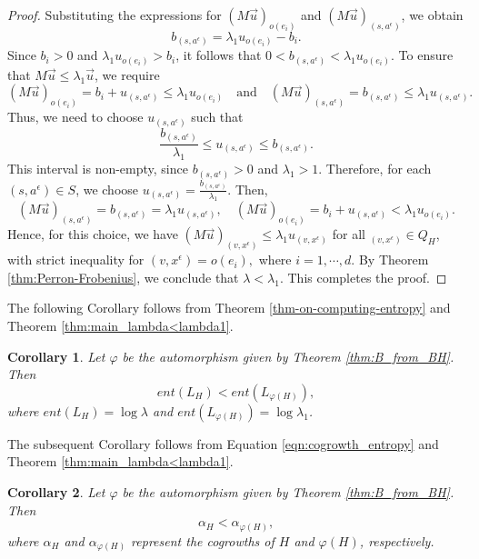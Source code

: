 \documentclass{article}
\newtheorem{mycor}{Corollary}[section]
\newcommand{\e}{\epsilon}
\begin{document}
\begin{proof}
    Substituting the expressions for $(M \overrightarrow{u})_{o(e_i)}$ and $(M \overrightarrow{u})_{(s,a^{\e})}$, we obtain
    $$b_{(s,a^{\e})} = \lambda_1 u_{o(e_i)} - b_i.$$
    Since $b_i > 0$ and $\lambda_1 u_{o(e_i)} > b_i$, it follows that $0 < b_{(s,a^{\e})} < \lambda_1 u_{o(e_i)}.$
    To ensure that $M \overrightarrow{u} \leq \lambda_1 \overrightarrow{u}$, we require
    $$(M \overrightarrow{u})_{o(e_i)} = b_i + u_{(s,a^{\e})} \leq \lambda_1 u_{o(e_i)} \quad \text{and} \quad (M \overrightarrow{u})_{(s,a^{\e})} = b_{(s,a^{\e})} \leq \lambda_1 u_{(s,a^{\e})}.$$
    Thus, we need to choose $u_{(s,a^{\e})}$ such that $$\frac{b_{(s,a^{\e})}}{\lambda_1} \leq u_{(s,a^{\e})} \leq b_{(s,a^{\e})}.$$
    This interval is non-empty, since $b_{(s,a^{\e})} > 0$ and $\lambda_1 > 1$. Therefore, for each $(s,a^{\e}) \in S$, we choose 
    $u_{(s,a^{\e})} = \frac{b_{(s,a^{\e})}}{\lambda_1}$. Then, 
    $$(M \overrightarrow{u})_{(s,a^{\e})} = b_{(s,a^{\e})} = \lambda_1 u_{(s,a^{\e})}, \quad (M \overrightarrow{u})_{o(e_i)} = b_i + u_{(s,a^{\e})} < \lambda_1 u_{o(e_i)}.$$
    Hence, for this choice, we have $(M \overrightarrow{u})_{(v, x^{\e})} \leq \lambda_1 u_{(v, x^{\e})}$ for all $_{(v, x^{\e})} \in Q_H$, with strict inequality for $(v, x^{\e}) = o(e_i),$ where $ i = 1,\cdots, d$. 
    By Theorem \ref{thm:Perron-Frobenius}, we conclude that $\lambda < \lambda_1.$ This completes the proof.
\end{proof}

The following Corollary follows from Theorem \ref{thm-on-computing-entropy} and Theorem \ref{thm:main_lambda<lambda1}. 
\begin{mycor}\label{cor:Entropy_inequality} 
    Let $\varphi$ be the automorphism given by Theorem \ref{thm:B_from_BH}. Then $$ent(L_H) < ent(L_{\varphi(H)}),$$ where $ent(L_H) = \log \lambda$ and $ent(L_{\varphi(H)}) = \log \lambda_1$.
\end{mycor}
The subsequent Corollary follows from Equation \eqref{eqn:cogrowth_entropy} and Theorem \ref{thm:main_lambda<lambda1}. 
\begin{mycor} \label{cor:cogrowthrates_inequality}
Let $\varphi$ be the automorphism given by Theorem \ref{thm:B_from_BH}. Then $$\alpha_H < \alpha_{\varphi(H)},$$ where 
$\alpha_H$ and $\alpha_{\varphi(H)}$ represent the cogrowths of $H$ and $\varphi(H)$, respectively.
\end{mycor}
\end{document}
